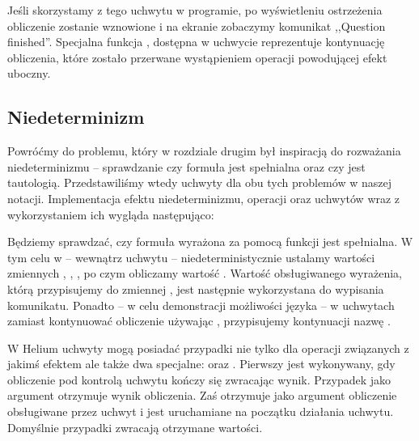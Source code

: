 

Jeśli skorzystamy z tego uchwytu w programie, po wyświetleniu ostrzeżenia obliczenie  zostanie wznowione i na ekranie zobaczymy komunikat ,,Question finished''. Specjalna funkcja , dostępna w uchwycie reprezentuje kontynuację obliczenia, które zostało przerwane wystąpieniem operacji powodującej efekt uboczny.

\subsection{Niedeterminizm}

Powróćmy do problemu, który w rozdziale drugim był inspiracją do rozważania niedeterminizmu -- sprawdzanie czy formuła jest spełnialna oraz czy jest tautologią. Przedstawiliśmy wtedy uchwyty dla obu tych problemów w naszej notacji. Implementacja efektu niedeterminizmu, operacji  oraz uchwytów wraz z wykorzystaniem ich wygląda następująco:


\pagebreak


Będziemy sprawdzać, czy formuła wyrażona za pomocą funkcji  jest spełnialna. W tym celu w  -- wewnątrz uchwytu -- niedeterministycznie ustalamy wartości zmiennych , , , po czym obliczamy wartość . Wartość obsługiwanego wyrażenia, którą przypisujemy do zmiennej , jest następnie wykorzystana do wypisania komunikatu. Ponadto -- w celu demonstracji możliwości języka -- w uchwytach zamiast kontynuować obliczenie używając , przypisujemy kontynuacji nazwę .

W Helium uchwyty mogą posiadać przypadki nie tylko dla operacji związanych z jakimś efektem ale także dwa specjalne:  oraz . Pierwszy jest wykonywany, gdy obliczenie pod kontrolą uchwytu kończy się zwracając wynik. Przypadek  jako argument otrzymuje wynik obliczenia. Zaś  otrzymuje jako argument obliczenie obsługiwane przez uchwyt i jest uruchamiane na początku działania uchwytu. Domyślnie przypadki zwracają otrzymane wartości.%


